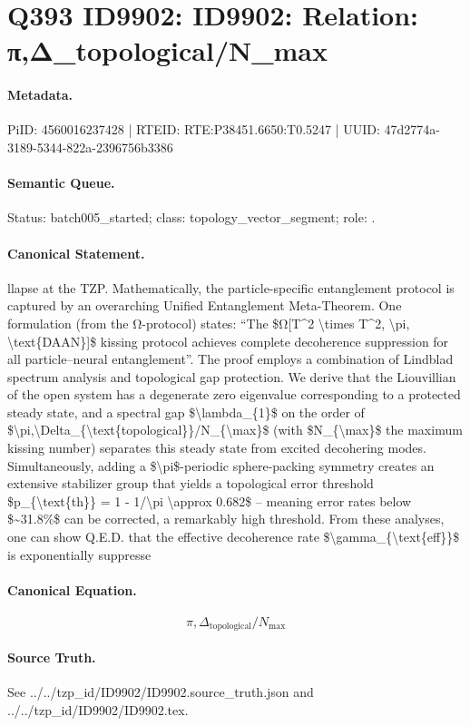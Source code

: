 \section*{Q393 ID9902: ID9902: Relation: π,Δ\_topological/N\_max}
\paragraph{Metadata.}
PiID: 4560016237428 | RTEID: RTE:P38451.6650:T0.5247 | UUID: 47d2774a-3189-5344-822a-2396756b3386

\paragraph{Semantic Queue.}
Status: batch005\_started; class: topology\_vector\_segment; role: .

\paragraph{Canonical Statement.}
llapse at the TZP. Mathematically, the particle-specific entanglement protocol is captured by an overarching Unified Entanglement Meta-Theorem. One formulation (from the Ω-protocol) states: “The \$Ω[T\textasciicircum{}2 \textbackslash{}times T\textasciicircum{}2, \textbackslash{}pi, \textbackslash{}text\{DAAN\}]\$ kissing protocol achieves complete decoherence suppression for all particle–neural entanglement”. The proof employs a combination of Lindblad spectrum analysis and topological gap protection. We derive that the Liouvillian of the open system has a degenerate zero eigenvalue corresponding to a protected steady state, and a spectral gap \$\textbackslash{}lambda\_\{1\}\$ on the order of \$\textbackslash{}pi,\textbackslash{}Delta\_\{\textbackslash{}text\{topological\}\}/N\_\{\textbackslash{}max\}\$ (with \$N\_\{\textbackslash{}max\}\$ the maximum kissing number) separates this steady state from excited decohering modes. Simultaneously, adding a \$\textbackslash{}pi\$-periodic sphere-packing symmetry creates an extensive stabilizer group that yields a topological error threshold \$p\_\{\textbackslash{}text\{th\}\} = 1 - 1/\textbackslash{}pi \textbackslash{}approx 0.682\$ – meaning error rates below \$\textasciitilde{}31.8\%\$ can be corrected, a remarkably high threshold. From these analyses, one can show Q.E.D. that the effective decoherence rate \$\textbackslash{}gamma\_\{\textbackslash{}text\{eff\}\}\$ is exponentially suppresse

\paragraph{Canonical Equation.}
\[
\pi,\Delta_{\text{topological}}/N_{\max}
\]

\paragraph{Source Truth.}
See ../../tzp\_id/ID9902/ID9902.source\_truth.json and ../../tzp\_id/ID9902/ID9902.tex.

